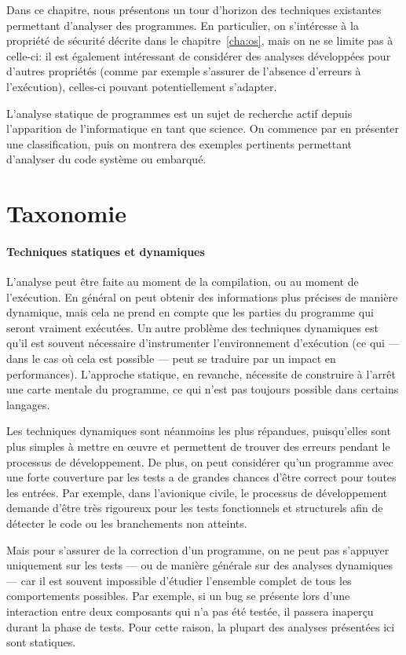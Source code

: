 Dans ce chapitre, nous présentons un tour d'horizon des techniques existantes
permettant d'analyser des programmes. En particulier, on s'intéresse à la
propriété de sécurité décrite dans le chapitre~\ref{cha:os}, mais on ne se
limite pas à celle-ci: il est également intéressant de considérer des analyses
développées pour d'autres propriétés (comme par exemple s'assurer de l'absence
d'erreurs à l'exécution), celles-ci pouvant potentiellement s'adapter.

L'analyse statique de programmes est un sujet de recherche actif depuis
l'apparition de l'informatique en tant que science. On commence par en présenter
une classification, puis on montrera des exemples pertinents permettant
d'analyser du code système ou embarqué.

\section{Taxonomie}

\paragraph{Techniques statiques et dynamiques}

L'analyse peut être faite au moment de la compilation, ou au moment de
l'exécution. En général on peut obtenir des informations plus précises de
manière dynamique, mais cela ne prend en compte que les parties du programme qui
seront vraiment exécutées. Un autre problème des techniques dynamiques est qu'il
est souvent nécessaire d'instrumenter l'environnement d'exécution (ce qui ---
dans le cas où cela est possible --- peut se traduire par un impact en
performances). L'approche statique, en revanche, nécessite de construire à
l'arrêt une carte mentale du programme, ce qui n'est pas toujours possible dans
certains langages.

Les techniques dynamiques sont néanmoins les plus répandues, puisqu'elles sont
plus simples à mettre en œuvre et permettent de trouver des erreurs pendant le
processus de développement. De plus, on peut considérer qu'un programme avec une
forte couverture par les tests a de grandes chances d'être correct pour toutes
les entrées. Par exemple, dans l'avionique civile, le processus de développement
demande d'être très rigoureux pour les tests fonctionnels et structurels afin de
détecter le code ou les branchements non atteints.

Mais pour s'assurer de la correction d'un programme, on ne peut pas s'appuyer
uniquement sur les tests --- ou de manière générale sur des analyses dynamiques
--- car il est souvent impossible d'étudier l'ensemble complet de tous les
comportements possibles. Par exemple, si un bug se présente lors d'une
interaction entre deux composants qui n'a pas été testée, il passera inaperçu
durant la phase de tests. Pour cette raison, la plupart des analyses présentées
ici sont statiques.

